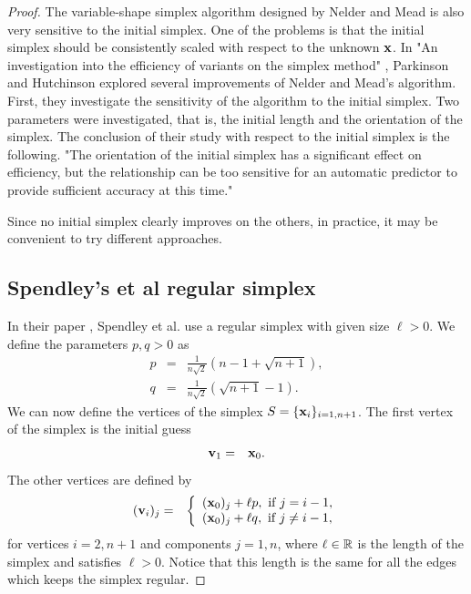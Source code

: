 \begin{proof}
The variable-shape simplex algorithm designed by Nelder and Mead is also very
sensitive to the initial simplex.
One of the problems is that the initial simplex should be consistently scaled 
with respect to the unknown $\mathbf{x}$.
In "An investigation into the efficiency of variants on the simplex method" \cite{parkinson1972}, 
Parkinson and Hutchinson explored 
several improvements of Nelder and Mead's algorithm. First, they investigate the sensitivity
of the algorithm to the initial simplex. Two parameters were investigated,
that is, the initial length and the orientation of the simplex. 
The conclusion of their study with respect to the initial simplex is 
the following. "The orientation of the initial simplex has a significant effect 
on efficiency, but the relationship can be too sensitive for an automatic 
predictor to provide sufficient accuracy at this time."

Since no initial simplex clearly improves on the others, in practice, 
it may be convenient to try different approaches.

\subsection{Spendley's et al regular simplex}

In their paper \cite{Spendley1962}, Spendley et al. use a regular 
simplex with given size $\ell>0$. We define the parameters $p,q>0$ as 
\begin{eqnarray}
p &=& \frac{1}{n\sqrt{2}} \left(n-1 + \sqrt{n+1}\right), \\
q &=& \frac{1}{n\sqrt{2}} \left(\sqrt{n+1} - 1\right).
\end{eqnarray}
We can now define the vertices of the simplex $S=\{\mathbf{x}_i\}_{i=1,n+1}$.
The first vertex of the simplex is the initial guess 
\begin{eqnarray}
\mathbf{v}_1 &=& \mathbf{x}_0.
\end{eqnarray}
The other vertices are defined by 
\begin{eqnarray}
(\mathbf{v}_i)_j &=& 
\left\{
\begin{array}{l}
(\mathbf{x}_0)_j + \ell p, \textrm{ if } j=i-1,\\
(\mathbf{x}_0)_j + \ell q, \textrm{ if } j\neq i-1,\\
\end{array}
\right.
\end{eqnarray}
for vertices $i=2,n+1$ and components $j=1,n$, 
where $\ell \in\mathbb{R}$ is the length of the simplex and satisfies $\ell>0$. Notice that this 
length is the same for all the edges which keeps the simplex regular.


\end{proof}
